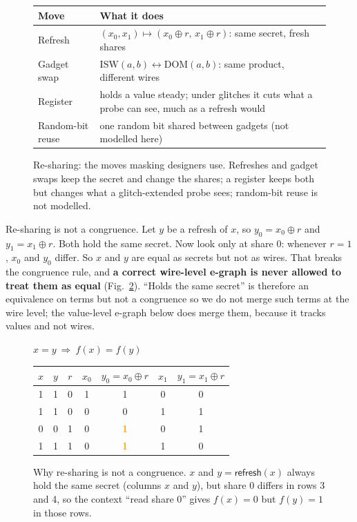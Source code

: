 \documentclass[conference]{IEEEtran}
\newcommand{\rf}{\mathsf{refresh}}
\begin{document}
\begin{figure}[!t]
\centering
{\footnotesize\begin{tabularx}{\columnwidth}{@{}l>{\raggedright\arraybackslash}X@{}}
\toprule
Move & What it does\\\midrule
Refresh & $(x_0,x_1)\mapsto(x_0\oplus r,\,x_1\oplus r)$: same secret, fresh shares\\
Gadget swap & $\mathrm{ISW}(a,b)\leftrightarrow\mathrm{DOM}(a,b)$: same product, different wires\\
Register & holds a value steady; under glitches it cuts what a probe can see, much as a refresh would\\
Random-bit reuse & one random bit shared between gadgets (not modelled here)\\
\bottomrule
\end{tabularx}}
\caption{Re-sharing: the moves masking designers use. Refreshes and gadget swaps keep the secret and change the shares; a register keeps both but changes what a glitch-extended probe sees; random-bit reuse is not modelled.}\label{fig:resharing}
\end{figure}

\begin{finding}{Re-sharing is not a congruence.}
Let $y$ be a refresh of $x$, so $y_0=x_0\oplus r$ and $y_1=x_1\oplus r$. Both hold the same secret. Now look only at share 0: whenever $r=1$, $x_0$ and $y_0$ differ. So $x$ and $y$ are equal as secrets but not as wires. That breaks the congruence rule, and \textbf{a correct wire-level e-graph is never allowed to treat them as equal} (Fig.~\ref{fig:congruence}). ``Holds the same secret'' is therefore an equivalence on terms but not a congruence so we do not merge such terms at the wire level; the value-level e-graph below does merge them, because it tracks values and not wires.
\end{finding}

\begin{figure}[!t]
\centering
$x=y\ \Rightarrow\ f(x)=f(y)$\par\smallskip
{\footnotesize\setlength{\tabcolsep}{5pt}\begin{tabular}{ccccccc}
\toprule
$x$ & $y$ & $r$ & $x_0$ & $y_0=x_0\oplus r$ & $x_1$ & $y_1=x_1\oplus r$\\\midrule
1&1&0&1&1&0&0\\
1&1&0&0&0&1&1\\
0&0&1&0&\textcolor{orange}{\textbf{1}}&0&1\\
1&1&1&0&\textcolor{orange}{\textbf{1}}&1&0\\
\bottomrule
\end{tabular}}
\caption{Why re-sharing is not a congruence. $x$ and $y=\rf(x)$ always hold the same secret (columns $x$ and $y$), but share 0 differs in rows 3 and 4, so the context ``read share 0'' gives $f(x)=0$ but $f(y)=1$ in those rows.}\label{fig:congruence}
\end{figure}
\end{document}

